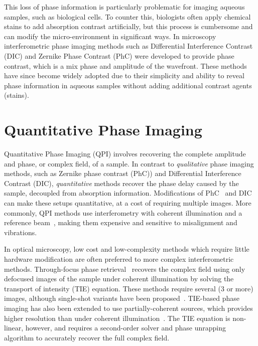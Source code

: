 This loss of phase information is particularly problematic for imaging aqueous samples, such as biological cells. To counter this, biologists often apply chemical stains to add absorption contrast artificially, but this process is cumbersome and can modify the micro-environment in significant ways. In microscopy interferometric phase imaging methods such as Differential Interference Contrast (DIC)\cite{smithDIC} and Zernike Phase Contrast (PhC) \cite{zernike1955discovered} were developed to provide phase contrast, which is a mix phase and amplitude of the wavefront. These methods have since become widely adopted due to their simplicity and ability to reveal phase information in aqueous samples without adding additional contrast agents (stains).

\section{Quantitative Phase Imaging}
Quantitative Phase Imaging (QPI) involves recovering the complete amplitude and phase, or complex field, of a sample. In contrast to \emph{qualitative} phase imaging methods, such as Zernike phase contrast (PhC)\cite{zernike1955discovered}) and Differential Interference Contrast (DIC)\cite{smithDIC}, \emph{quantitative} methods recover the phase delay caused by the sample, decoupled from absorption information. Modifications of PhC~\cite{yun2010system} and DIC~\cite{CuiYangTearney2011} can make these setups quantitative, at a cost of requiring multiple images. More commonly, QPI methods use interferometry with coherent illumination and a reference beam~\cite{Popescu:06,Wang:11,Bhaduri:12}, making them expensive and sensitive to misalignment and vibrations.

In optical microscopy, low cost and low-complexity methods which require little hardware modification are often preferred to more complex interferometric methods. Through-focus phase retrieval~\cite{waller2010transport, Petruccelli:12, Jingshan14GPTIE} recovers the complex field using only defocused images of the sample under coherent illumination by solving the transport of intensity (TIE) equation. These methods require several (3 or more) images, although single-shot variants have been proposed~\cite{wallerColorTIE}. TIE-based phase imaging has also been extended to use partially-coherent sources, which provides higher resolution than under coherent illumination~\cite{JingsanSourceRecovery2016}. The TIE equation is non-linear, however, and requires a second-order solver and phase unrapping algorithm to accurately recover the full complex field.

